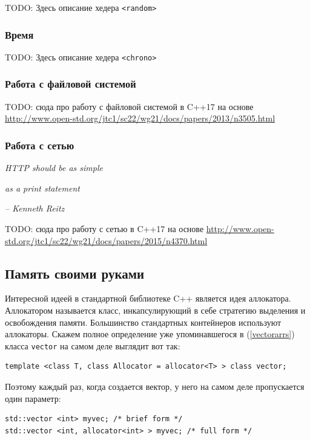 \documentclass[a4paper,12pt,oneside]{article}
\begin{document}
TODO: Здесь описание хедера \lstinline!<random>!

\subsubsection{Время}\label{Chrono}

TODO: Здесь описание хедера \lstinline!<chrono>!

\subsubsection{Работа с файловой системой}\label{NewFS}

TODO: сюда про работу с файловой системой в C++17 на основе \url{http://www.open-std.org/jtc1/sc22/wg21/docs/papers/2013/n3505.html}

\subsubsection{Работа с сетью}\label{NewASIO}

\hfill\textit{HTTP should be as simple}

\hfill\textit{as a print statement}{\vspace{0.5em}}

\hfill\textit{-- Kenneth Reitz}

TODO: сюда про работу с сетью в C++17 на основе \url{http://www.open-std.org/jtc1/sc22/wg21/docs/papers/2015/n4370.html}

\subsection{Память своими руками}\label{allocators}

Интересной идеей в стандартной библиотеке C++ является идея аллокатора. Аллокатором называется класс, инкапсулирующий в себе стратегию выделения и освобождения памяти. Большинство стандартных контейнеров используют аллокаторы. Скажем полное определение уже упоминавшегося в (\ref{vectorarrs}) класса \lstinline!vector! на самом деле выглядит вот так:

\begin{lstlisting}
template <class T, class Allocator = allocator<T> > class vector;
\end{lstlisting}

Поэтому каждый раз, когда создается вектор, у него на самом деле пропускается один параметр:

\begin{lstlisting}
std::vector <int> myvec; /* brief form */
std::vector <int, allocator<int> > myvec; /* full form */
\end{lstlisting}
\end{document}
